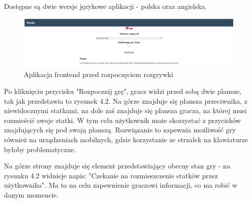 Dostępne są dwie wersje językowe aplikacji - polska oraz angielska.

\begin{figure}[!h]
    \label{fig:frontend-start}
    \centering \includegraphics[width=1\linewidth]{img/frontend-start.PNG}
    \caption{Aplikacja frontend przed rozpoczęciem rozgrywki}
\end{figure}

Po kliknięciu przycisku "Rozpocznij grę", gracz widzi przed sobą dwie plansze, tak jak przedstawia to rysunek 4.2. Na górze znajduje się plansza przeciwnika, z niewidocznymi statkami, na dole zaś znajduje się plansza gracza, na której musi rozmieścić swoje statki. W tym celu użytkownik może skorzystać z przycisków znajdujących się pod swoją planszą. Rozwiązanie to zapewnia możliwość gry również na urządzeniach mobilnych, gdzie korzystanie ze strzałek na klawiaturze byłoby problematyczne.

\indent Na górze strony znajduje się element przedstawiający obecny stan gry - na rysunku 4.2 widnieje napis: "Czekanie na rozmieszczenie statków przez użytkownika". Ma to na celu zapewnienie graczowi informacji, co ma robić w danym momencie.

